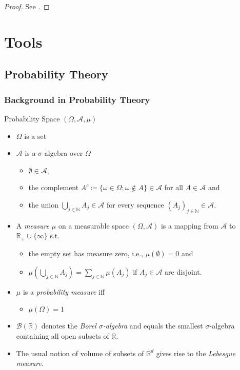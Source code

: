 \documentclass[oneside,11pt]{book}
\numberwithin{equation}{section}
\begin{document}
\begin{proof}
    See \cite[p. 363]{Dashti_Stuart2017}.
\end{proof}

\appendix

\chapter{Tools}

\section{Probability Theory}

\subsection{Background in Probability Theory}
Probability Space $(\Omega,\mathcal{A},\mu)$
\begin{itemize}
    \item $\Omega$ is a set
    \item $\mathcal{A}$ is a $\sigma$-algebra over $\Omega$
    \begin{itemize}
        \item $\emptyset\in\mathcal{A}$,
        \item the complement $A^c\coloneqq\{\omega\in\Omega;\omega\notin A\}\in\mathcal{A}$ for all $A\in\mathcal{A}$ and
        \item the union $\bigcup_{j\in\mathbb{N}} A_j\in\mathcal{A}$ for every sequence $(A_j)_{j\in\mathbb{N}}\in\mathcal{A}$.
    \end{itemize}
    \item A \textit{measure} $\mu$ on a measurable space $(\Omega,\mathcal{A})$ is a mapping from $\mathcal{A}$ to $\mathbb{R}_+\cup\{\infty\}$ s.t.
    \begin{itemize}
        \item the empty set has measure zero, i.e., $\mu(\emptyset) = 0$ and
        \item $\mu\left(\bigcup_{j\in\mathbb{N}} A_j\right) = \sum_{j\in\mathbb{N}} \mu(A_j)$ if $A_j\in\mathcal{A}$ are disjoint.
    \end{itemize}
    \item $\mu$ is a \textit{probability measure} iff
    \begin{itemize}
        \item $\mu(\Omega) = 1$
    \end{itemize}
    \item $\mathcal{B}(\mathbb{R})$ denotes the \textit{Borel $\sigma$-algebra} and equals the smallest $\sigma$-algebra containing all open subsets of $\mathbb{R}$.
    \item The usual notion of volume of subsets of $\mathbb{R}^d$ gives rise to the \textit{Lebesgue measure}.
\end{itemize}
\end{document}
